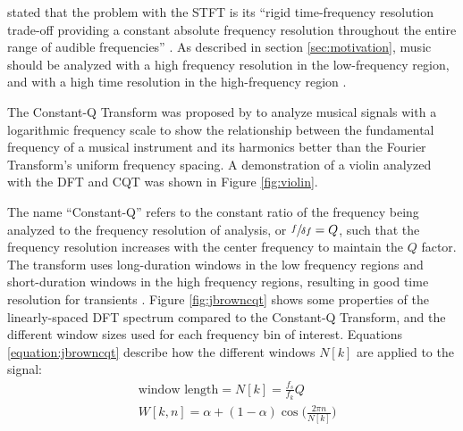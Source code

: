 \documentclass[report.tex]{subfiles}
\begin{document}
\citeauthor{cqtransient} stated that the problem with the STFT is its ``rigid time-frequency resolution trade-off providing a constant absolute frequency resolution throughout the entire range of audible frequencies'' \parencite[1]{cqtransient}. As described in section \ref{sec:motivation}, music should be analyzed with a high frequency resolution in the low-frequency region, and with a high time resolution in the high-frequency region \parencite{doerflerphd, cqtransient}. 

The Constant-Q Transform was proposed by \textcite{jbrown, msp} to analyze musical signals with a logarithmic frequency scale to show the relationship between the fundamental frequency of a musical instrument and its harmonics better than the Fourier Transform's uniform frequency spacing. A demonstration of a violin analyzed with the DFT and CQT was shown in Figure \ref{fig:violin}.

The name ``Constant-Q'' refers to the constant ratio of the frequency being analyzed to the frequency resolution of analysis, or $\sfrac{f}{\delta f} = Q$, such that the frequency resolution increases with the center frequency to maintain the $Q$ factor. The transform uses long-duration windows in the low frequency regions and short-duration windows in the high frequency regions, resulting in good time resolution for transients \parencite{cqtransient}. Figure \ref{fig:jbrowncqt} shows some properties of the linearly-spaced DFT spectrum compared to the Constant-Q Transform, and the different window sizes used for each frequency bin of interest. Equations \eqref{equation:jbrowncqt} describe how the different windows $N[k]$ are applied to the signal:
\begin{align}\tag{9}\label{equation:jbrowncqt}
	\nonumber & \text{window length} = N[k] = \frac{f_{s}}{f_{k}}Q\\
	\nonumber & W[k, n] = \alpha + (1 - \alpha)\cos\big(\frac{2\pi n}{N[k]}\big)
\end{align}
\end{document}
